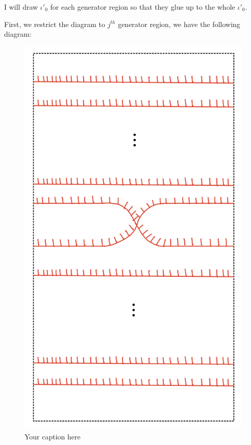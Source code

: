 I will draw $\iota'_0$ for each generator region so that they glue up to the whole $\iota'_0$. 

First, we restrict the diagram to $j^{th}$ generator region, we have the following diagram:

\begin{figure}[H] %
    \centering
    \includegraphics[scale = 0.95]{diagrams/natural_alternating_diagrams/8.png} %
    \caption{Your caption here}
    \label{fig:your-label}
\end{figure}


